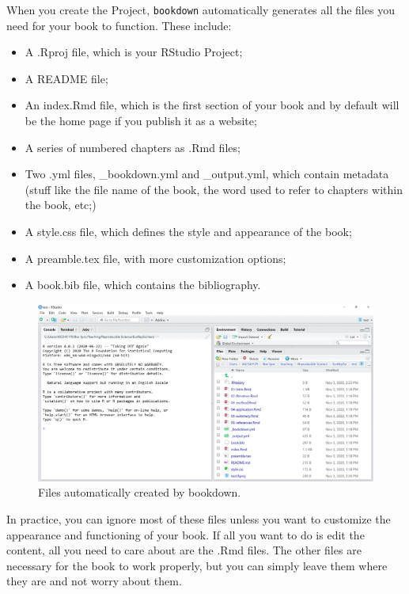 \documentclass[
]{book}
\providecommand{\tightlist}{%
  \setlength{\itemsep}{0pt}\setlength{\parskip}{0pt}}
\begin{document}
When you create the Project, \texttt{bookdown} automatically generates all the files you need for your book to function. These include:

\begin{itemize}
\tightlist
\item
  A .Rproj file, which is your RStudio Project;
\item
  A README file;
\item
  An index.Rmd file, which is the first section of your book and by default will be the home page if you publish it as a website;
\item
  A series of numbered chapters as .Rmd files;
\item
  Two .yml files, \_bookdown.yml and \_output.yml, which contain metadata (stuff like the file name of the book, the word used to refer to chapters within the book, etc;)
\item
  A style.css file, which defines the style and appearance of the book;
\item
  A preamble.tex file, with more customization options;
\item
  A book.bib file, which contains the bibliography.
\end{itemize}

\begin{figure}
\centering
\includegraphics{img/bookdown-files.jpg}
\caption{Files automatically created by bookdown.}
\end{figure}

In practice, you can ignore most of these files unless you want to customize the appearance and functioning of your book. If all you want to do is edit the content, all you need to care about are the .Rmd files. The other files are necessary for the book to work properly, but you can simply leave them where they are and not worry about them.
\end{document}
